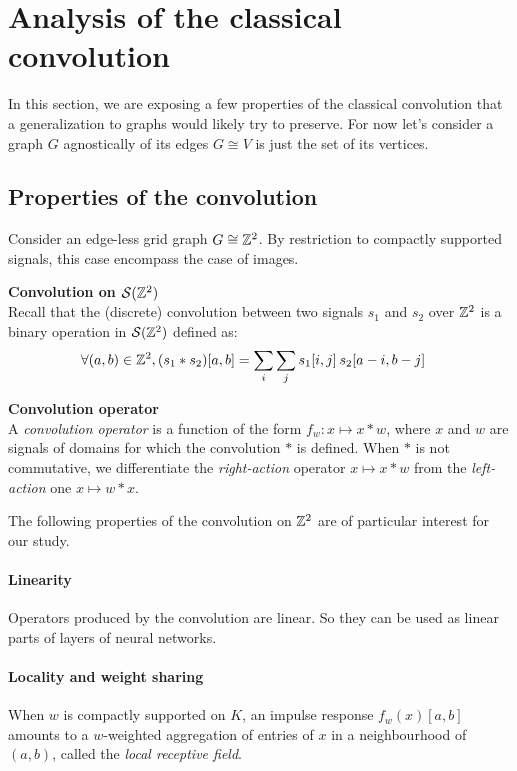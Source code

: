 \section{Analysis of the classical convolution}

In this section, we are exposing a few properties of the classical convolution that a generalization to graphs would likely try to preserve. For now let's consider a graph $G$ agnostically of its edges \ie $G \cong V$ is just the set of its vertices.

\subsection{Properties of the convolution}

Consider an edge-less grid graph \ie $G \cong \bbz^2$. By restriction to compactly supported signals, this case encompass the case of images.

\begin{definition}\textbf{Convolution on $\cs(\bbz^2)$}\\
Recall that the (discrete) convolution between two signals $s_1$ and $s_2$ over $\bbz^2$ is a binary operation in $\cs(\bbz^2)$ defined as:
\begin{align*}
\forall (a,b) \in \bbz^2, (s_1 \ast s_2) [a,b] & = \displaystyle \sum_i \sum_j s_1[i,j] \h{2} s_2[a-i, b-j]
\end{align*}
\end{definition}

\begin{definition}\textbf{Convolution operator}\\
A \emph{convolution operator} is a function of the form $f_w: x \mapsto x \ast w$, where $x$ and $w$ are signals of domains for which the convolution $\ast$ is defined. When $\ast$ is not commutative, we differentiate the \emph{right-action} operator $x \mapsto x \ast w$ from the \emph{left-action} one $x \mapsto w \ast x$.
\end{definition}

The following properties of the convolution on $\bbz^2$ are of particular interest for our study.

\paragraph{Linearity}
Operators produced by the convolution are linear. So they can be used as linear parts of layers of neural networks.

\paragraph{Locality and weight sharing}
When $w$ is compactly supported on $K$, an impulse response $f_w(x)[a,b]$ amounts to a $w$-weighted aggregation of entries of $x$ in a neighbourhood of $(a,b)$, called the \emph{local receptive field}.

